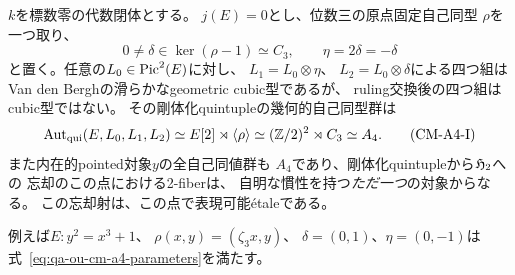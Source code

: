 \begin{proposition}[$j=0$の一cubic ruling例外と$A_4$慣性]
\label{prop:qa-ou-cm-jzero-one-cubic-a4}
$k$を標数零の代数閉体とする。
$j(E)=0$とし、位数三の原点固定自己同型
$\rho$を一つ取り、
\[
 0\ne\delta\in\ker(\rho-1)\simeq C_3,
 \qquad \eta=2\delta=-\delta
 \tag{CM-A4}\label{eq:qa-ou-cm-a4-parameters}
\]
と置く。任意の$L_0\in\operatorname{Pic}^2(E)$に対し、
$L_1=L_0\otimes\eta$、
$L_2=L_0\otimes\delta$による四つ組は
Van den Berghの滑らかなgeometric cubic型であるが、
ruling交換後の四つ組はcubic型ではない。
その剛体化quintupleの幾何的自己同型群は
\[
 \operatorname{Aut}_{\mathrm{qui}}(E,L_0,L_1,L_2)
       \simeq E[2]\rtimes\langle\rho\rangle
       \simeq(\mathbb Z/2)^2\rtimes C_3
       \simeq A_4 .
 \tag{CM-A4-I}\label{eq:qa-ou-cm-a4-inertia}
\]
また内在的pointed対象$y$の全自己同値群も
$A_4$であり、剛体化quintupleから$\mathfrak H_2$への
忘却のこの点における2-fiberは、
自明な慣性を持つ\emph{ただ一つ}の対象からなる。
この忘却射は、この点で表現可能étaleである。

例えば$E:y^2=x^3+1$、
$\rho(x,y)=(\zeta_3x,y)$、
$\delta=(0,1)$、$\eta=(0,-1)$は
式~\eqref{eq:qa-ou-cm-a4-parameters}を満たす。
\end{proposition}
